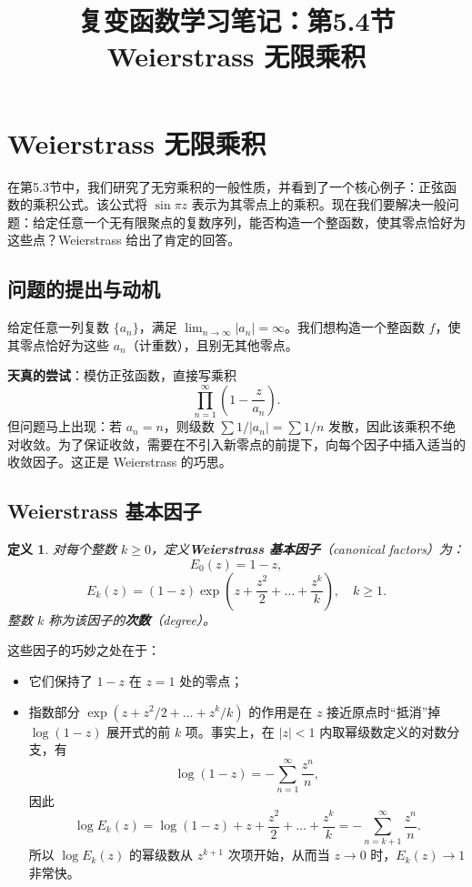 \documentclass[UTF8]{ctexart}
\title{复变函数学习笔记：第5.4节 Weierstrass 无限乘积}
\author{}
\date{}
\newtheorem{definition}[theorem]{定义}
\numberwithin{equation}{section}
\begin{document}
\maketitle

\section{Weierstrass 无限乘积}

在第5.3节中，我们研究了无穷乘积的一般性质，并看到了一个核心例子：正弦函数的乘积公式。该公式将 \(\sin \pi z\) 表示为其零点上的乘积。现在我们要解决一般问题：给定任意一个无有限聚点的复数序列，能否构造一个整函数，使其零点恰好为这些点？Weierstrass 给出了肯定的回答。

\subsection{问题的提出与动机}

给定任意一列复数 \(\{a_n\}\)，满足 \(\lim_{n\to\infty} |a_n| = \infty\)。我们想构造一个整函数 \(f\)，使其零点恰好为这些 \(a_n\)（计重数），且别无其他零点。

\textbf{天真的尝试}：模仿正弦函数，直接写乘积
\[
\prod_{n=1}^\infty \left(1 - \frac{z}{a_n}\right).
\]
但问题马上出现：若 \(a_n = n\)，则级数 \(\sum 1/|a_n| = \sum 1/n\) 发散，因此该乘积不绝对收敛。为了保证收敛，需要在不引入新零点的前提下，向每个因子中插入适当的收敛因子。这正是 Weierstrass 的巧思。

\subsection{Weierstrass 基本因子}

\begin{definition}\label{def:canonical}
对每个整数 \(k \ge 0\)，定义\textbf{Weierstrass 基本因子}（canonical factors）为：
\[
E_0(z) = 1 - z,
\]
\[
E_k(z) = (1 - z) \exp\left(z + \frac{z^2}{2} + \dots + \frac{z^k}{k}\right), \quad k \ge 1.
\]
整数 \(k\) 称为该因子的\textbf{次数}（degree）。
\end{definition}

这些因子的巧妙之处在于：
\begin{itemize}
\item 它们保持了 \(1 - z\) 在 \(z = 1\) 处的零点；
\item 指数部分 \(\exp(z + z^2/2 + \dots + z^k/k)\) 的作用是在 \(z\) 接近原点时“抵消”掉 \(\log(1 - z)\) 展开式的前 \(k\) 项。事实上，在 \(|z| < 1\) 内取幂级数定义的对数分支，有
\[
\log(1 - z) = -\sum_{n=1}^\infty \frac{z^n}{n},
\]
因此
\[
\log E_k(z) = \log(1 - z) + z + \frac{z^2}{2} + \dots + \frac{z^k}{k} = -\sum_{n=k+1}^\infty \frac{z^n}{n}.
\]
所以 \(\log E_k(z)\) 的幂级数从 \(z^{k+1}\) 次项开始，从而当 \(z \to 0\) 时，\(E_k(z) \to 1\) 非常快。
\end{itemize}
\end{document}
